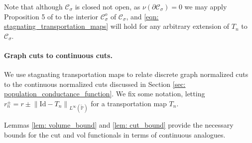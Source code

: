 \documentclass[11pt,twoside]{article}
\newcommand{\vol}{\mathrm{vol}}
\newcommand{\cut}{\mathrm{cut}}
\newcommand{\norm}[1]{\left\lVert#1\right\rVert}
\newcommand{\1}{\mathbf{1}}
\newcommand{\Pbb}{\mathbb{P}}
\newcommand{\Cset}{\mathcal{C}}
\newcommand{\Csig}{\Cset_{\sigma}}
\begin{document}

Note that although $\Csig$ is closed not open, as $\nu(\partial \Csig) = 0$ we may apply Proposition 5 of \cite{garciatrillos16} to the interior $\Csig^o$ of $\Csig$, and \eqref{eqn: stagnating_transportation_maps} will hold for any arbitrary extension of $T_n$ to $\Csig$.

\paragraph{Graph cuts to continuous cuts.}

We use stagnating transportation maps to relate discrete graph normalized cuts to the continuous normalized cuts discussed in Section \ref{sec: population_conductance_function}. We fix some notation, letting $r_n^{\pm} = r \pm \norm{\mathrm{Id} - T_n}_{L^{\infty}(\widetilde{\Pbb})}$ for a transportation map $T_n$.

Lemmas \ref{lem: volume_bound} and \ref{lem: cut_bound} provide the necessary bounds for the $\cut$ and $\vol$ functionals in terms of continuous analogues.
\end{document}
